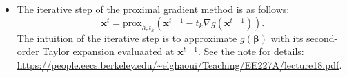 \begin{itemize}
            
        \item The iterative step of the proximal gradient method is as follows:
            \begin{equation}
                    \bm{x}^t = \text{prox}_{h, t_k}\left( \bm{x}^{t-1} - t_k \nabla g(\bm{x}^{t-1}) \right).
            \end{equation}
        The intuition of the iterative step is to approximate $g(\bm{\beta})$ with its second-order Taylor expansion evaluaated at $\bm{x}^{t-1}$.
        See the note for details: \url{https://people.eecs.berkeley.edu/~elghaoui/Teaching/EE227A/lecture18.pdf}.
    \end{itemize}